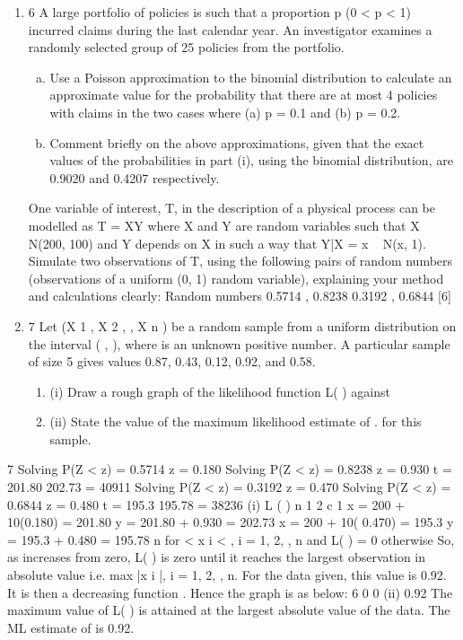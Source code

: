 \documentclass[a4paper,12pt]{article}
\begin{document}
\begin{enumerate}

\item 6
A large portfolio of policies is such that a proportion p (0 < p < 1) incurred claims
during the last calendar year. An investigator examines a randomly selected group of
25 policies from the portfolio.

\begin{enumerate}[(a)]
\item Use a Poisson approximation to the binomial distribution to calculate an
approximate value for the probability that there are at most 4 policies with
claims in the two cases where (a) p = 0.1 and (b) p = 0.2.
\item Comment briefly on the above approximations, given that the exact values of
the probabilities in part (i), using the binomial distribution, are 0.9020 and
0.4207 respectively.
\end{enumerate}

One variable of interest, T, in the description of a physical process can be modelled as
T = XY where X and Y are random variables such that X ~ N(200, 100) and Y depends
on X in such a way that Y|X = x ~ N(x, 1).
Simulate two observations of T, using the following pairs of random numbers
(observations of a uniform (0, 1) random variable), explaining your method and
calculations clearly:
Random numbers
0.5714 , 0.8238
0.3192 , 0.6844
[6]
\item 7
Let (X 1 , X 2 , , X n ) be a random sample from a uniform distribution on the interval
( , ), where is an unknown positive number.
A particular sample of size 5 gives values 0.87, 0.43, 0.12, 0.92, and 0.58.
\begin{enumerate}
\item (i) Draw a rough graph of the likelihood function L( ) against
\item (ii) State the value of the maximum likelihood estimate of . for this sample.
\end{enumerate}
\end{enumerate}




7
Solving P(Z < z) = 0.5714 z = 0.180
Solving P(Z < z) = 0.8238 z = 0.930
t = 201.80 202.73 = 40911
Solving P(Z < z) = 0.3192 z = 0.470
Solving P(Z < z) = 0.6844 z = 0.480
t = 195.3 195.78 = 38236
(i)
L ( )
n
1
2
c
1
x = 200 + 10(0.180) = 201.80
y = 201.80 + 0.930 = 202.73
x = 200 + 10( 0.470) = 195.3
y = 195.3 + 0.480 = 195.78
n
for
< x i < , i = 1, 2,
, n and L( ) = 0 otherwise
So, as increases from zero, L( ) is zero until it reaches the largest
observation in absolute value i.e. max |x i |, i = 1, 2, , n. For the data given,
this value is 0.92.
It is then a decreasing function . Hence the graph is as below:
6
0
0
(ii)
0.92
The maximum value of L( ) is attained at the largest absolute value of the
data. The ML estimate of is 0.92.
\end{document}
